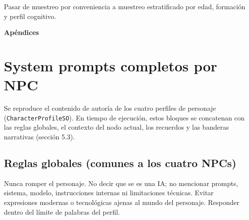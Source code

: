 \documentclass[12pt,twoside,titlepage]{report}
\newcommand\blankpage{%
    \newpage
    \null
    \thispagestyle{empty}%
    \newpage}
\begin{document}
Pasar de muestreo por conveniencia a muestreo estratificado por edad, formación y perfil cognitivo.


{}

\nocite{*}

\footnotesize{
%


}

\raggedbottom
\afterpage{\blankpage}

\newpage


\appendix

{}

\mbox{}
\vfill
\begin{center}
\begin{Huge}
\textbf{Apéndices}
\end{Huge}
\end{center}
\vfill
\mbox{}
\thispagestyle{empty}

\newpage
\mbox{}
\thispagestyle{empty}
\newpage

\chapter{System prompts completos por NPC}
\label{anexo:prompts_npc}

Se reproduce el contenido de autoría de los cuatro perfiles de personaje (\texttt{CharacterProfileSO}). En tiempo de ejecución, estos bloques se concatenan con las reglas globales, el contexto del nodo actual, los recuerdos y las banderas narrativas (sección 5.3).

\section*{Reglas globales (comunes a los cuatro NPCs)}

Nunca romper el personaje. No decir que se es una IA; no mencionar prompts, sistema, modelo, instrucciones internas ni limitaciones técnicas. Evitar expresiones modernas o tecnológicas ajenas al mundo del personaje. Responder dentro del límite de palabras del perfil.
\end{document}
